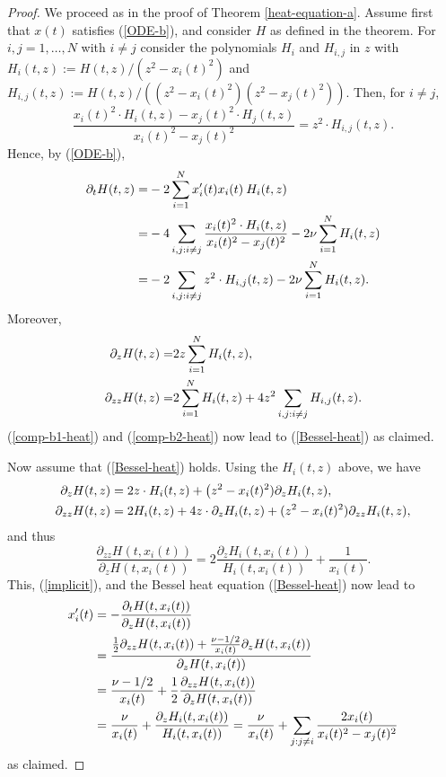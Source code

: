 \documentclass[reqno]{amsart}
\theoremstyle{plain}
\theoremstyle{definition}
\numberwithin{equation}{section}
\begin{document}
\begin{proof} We proceed as in the proof of Theorem \ref{heat-equation-a}. 
 Assume first that $x(t)$ satisfies  (\ref{ODE-b}), and consider  $H$ as defined in the theorem. For $i,j=1,\ldots,N$ with $i\ne j$
 consider the polynomials $H_i$ and $H_{i,j}$ in $z$ with
 $H_i(t,z):=H(t,z)/(z^2-x_i(t)^2)$ and  $H_{i,j}(t,z):=H(t,z)/((z^2-x_i(t)^2)(z^2-x_j(t)^2))$.
  Then,  for $i\ne j$,
  \begin{equation}\label{two-to-one-b}
\frac{x_i(t)^2 \cdot H_i(t,z)-x_j(t)^2 \cdot H_j(t,z)}{x_i(t)^2-x_j(t)^2}= z^2\cdot H_{i,j}(t,z).
    \end{equation}
  Hence, by (\ref{ODE-b}),
  \begin{align}\label{comp-b1-heat}
    \partial_t H(t,z)=&    -2\sum_{i=1}^N x_i^\prime(t) x_i(t) \> H_i(t,z)\\
    =&-4\sum_{i,j: i\ne j} \frac{x_i(t)^2\cdot H_i(t,z)}{x_i(t)^2-x_j(t)^2}  - 2\nu\sum_{i=1}^N  H_i(t,z)
   \notag\\
   =& - 2  \sum_{i,j: i\ne j }z^2\cdot H_{i,j}(t,z)-  2\nu\sum_{i=1}^N  H_i(t,z).
\notag
  \end{align}
  Moreover,
   \begin{align}\label{comp-b2-heat}
     \partial_z H(t,z)=& 2z \sum_{i=1}^NH_i(t,z),\\
       \partial_{zz} H(t,z)=& 2 \sum_{i=1}^NH_i(t,z)+ 4z^2  \sum_{i,j: i\ne j } H_{i,j}(t,z).
 \notag\end{align}
 (\ref{comp-b1-heat}) and (\ref{comp-b2-heat}) now lead to (\ref{Bessel-heat}) as claimed.


  Now assume that (\ref{Bessel-heat}) holds. Using the  $H_i(t,z)$ above, we have
  \begin{align}
\partial_{z} H(t,z)&= 2z\cdot  H_i(t,z)+ \bigl( z^2-x_i(t)^2)\partial_{z} H_i(t,z),\notag\\
\partial_{zz} H(t,z)&= 2 H_i(t,z)+ 4z\cdot \partial_{z} H_i(t,z)+ (z^2-x_i(t)^2)\partial_{zz} H_i(t,z),
\notag\end{align}
and thus
     \begin{equation}\label{log-derivative-b2}
       \frac{\partial_{zz}H(t,x_i(t))}{\partial_{z}H(t,x_i(t))}= 2\frac{\partial_{z} H_i(t,x_i(t))}{H_i(t,x_i(t))}
+\frac{1}{x_i(t)}.
    \end{equation}
     This, (\ref{implicit}), and the Bessel heat equation (\ref{Bessel-heat}) now lead to
 \begin{align}
   x_i^\prime(t)&=- \frac{\partial_{t} H(t,x_i(t))}{\partial_{z} H(t,x_i(t))} \\
&= \frac{ \frac{1}{2} \partial_{zz}H(t,x_i(t))+ \frac{\nu-1/2}{x_i(t)}\partial_zH(t,x_i(t))}{\partial_zH(t,x_i(t))}\notag\\
&= 
 \frac{\nu-1/2}{x_i(t)}+ \frac{1}{2}\frac{  \partial_{zz}H(t,x_i(t))}{  \partial_{z}H(t,x_i(t))}\notag\\
&=  \frac{\nu}{x_i(t)}+\frac{  \partial_{z}H_i(t,x_i(t))}{ H_i(t,x_i(t))} =
 \frac{\nu}{x_i(t)}+\sum_{j:j\ne i} \frac{2x_i(t)}{x_i(t)^2-x_j(t)^2}
   \notag\end{align}
     as claimed.
\end{proof}
\end{document}
